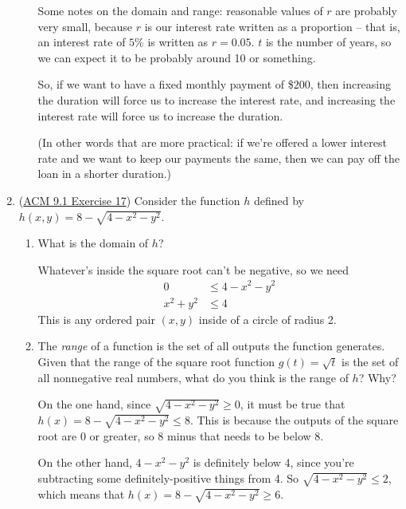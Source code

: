 \begin{enumerate}[leftmargin=0pt]
\begin{enumerate}
\begin{red}
        Some notes on the domain and range: reasonable values of $r$ are probably very small, because $r$ is our interest rate written as a proportion -- that is, an interest rate of $5\%$ is written as $r = 0.05$. $t$ is the number of years, so we can expect it to be probably around 10 or something.
        
        So, if we want to have a fixed monthly payment of \$200, then increasing the duration will force us to increase the interest rate, and increasing the interest rate will force us to increase the duration.
        
        (In other words that are more practical: if we're offered a lower interest rate and we want to keep our payments the same, then we can pay off the loan in a shorter duration.)
        \end{red}
    \end{enumerate}
    \item (\href{https://activecalculus.org/multi/S-9-1-Functions.html#Ez-9-1-3}{ACM 9.1 Exercise 17}) Consider the function $h$ defined by $h(x,y) = 8-\sqrt{4-x^2-y^2}$.
    \begin{enumerate}
        \item What is the domain of $h$?

        \begin{red}
            Whatever's inside the square root can't be negative, so we need
            \begin{align*}
                0 &\leq 4 - x^2 - y^2 \\
                x^2 + y^2 &\leq 4
            \end{align*}
            This is any ordered pair $(x,y)$ inside of a circle of radius 2.
        \end{red}

        \item The \textit{range} of a function is the set of all outputs the function generates. Given that the range of the square root function $g(t) = \sqrt{t}$ is the set of all nonnegative real numbers, what do you think is the range of $h$? Why?

        \begin{red}
            On the one hand, since $\sqrt{4-x^2-y^2} \geq 0$, it must be true that $h(x) = 8-\sqrt{4-x^2-y^2} \leq 8$. This is because the outputs of the square root are 0 or greater, so 8 minus that needs to be below 8.

            On the other hand, $4-x^2-y^2$ is definitely below 4, since you're subtracting some definitely-positive things from 4. So $\sqrt{4-x^2-y^2} \leq 2$, which means that $h(x) = 8 - \sqrt{4-x^2-y^2} \geq 6$.


\end{red}
\end{enumerate}
\end{enumerate}
